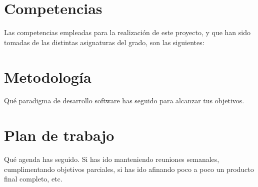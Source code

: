 \section{Competencias}
\label{sec:competencias}

Las competencias empleadas para la realización de este proyecto, y que han sido
tomadas de las distintas asignaturas del grado, son las siguientes:

\section{Metodología}
\label{sec:metodologia}

Qué paradigma de desarrollo software has seguido para alcanzar tus objetivos.

\section{Plan de trabajo}
\label{sec:plantrabajo}

Qué agenda has seguido. Si has ido manteniendo reuniones semanales, cumplimentando objetivos parciales, si has ido afinando poco a poco un producto final completo, etc.
